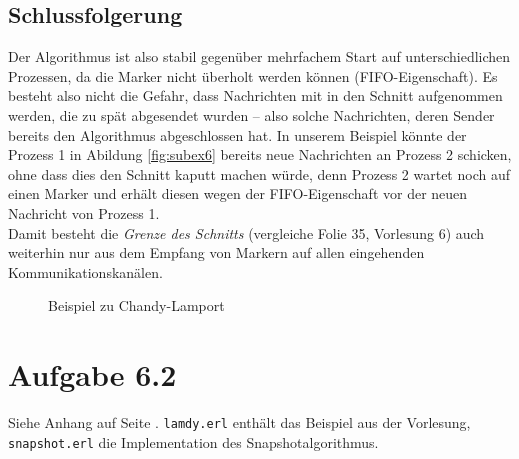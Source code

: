 \documentclass[a4paper,
12pt,
BCOR12mm,
]{scrartcl}
\theoremstyle{break}
\begin{document}
\subsection*{Schlussfolgerung}
Der Algorithmus ist also stabil gegenüber mehrfachem Start auf unterschiedlichen
Prozessen, da die Marker nicht überholt werden können (FIFO-Eigenschaft). Es besteht also
nicht die Gefahr, dass Nachrichten mit in den Schnitt aufgenommen werden, die zu spät
abgesendet wurden -- also solche Nachrichten, deren Sender bereits den Algorithmus
abgeschlossen hat. In unserem Beispiel könnte der Prozess 1 in Abildung \ref{fig:subex6} bereits neue Nachrichten an
Prozess 2 schicken, ohne dass dies den Schnitt kaputt machen würde, denn Prozess 2 wartet
noch auf einen Marker und erhält diesen wegen der FIFO-Eigenschaft vor der neuen Nachricht
von Prozess 1. \\
Damit besteht die \emph{Grenze des Schnitts} (vergleiche Folie 35, Vorlesung 6) auch
weiterhin nur aus dem Empfang von Markern auf allen eingehenden Kommunikationskanälen.

\begin{figure}[ht!]
  \begin{center}
  \end{center}
  \caption{Beispiel zu Chandy-Lamport}
  \label{fig:example}
\end{figure}

\section*{Aufgabe 6.2}
Siehe Anhang auf Seite \pageref{Anhang}. \verb|lamdy.erl| enthält das Beispiel aus der
Vorlesung, \verb|snapshot.erl| die Implementation des Snapshotalgorithmus.
\end{document}

